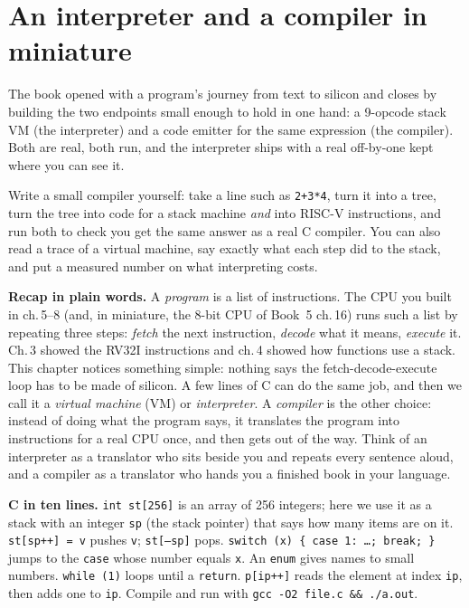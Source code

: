 \chapter{An interpreter and a compiler in miniature}
\label{ch:systems18}

The book opened with a program's journey from text to silicon and
closes by building the two endpoints small enough to hold in one
hand: a 9-opcode stack VM (the interpreter) and a code emitter for
the same expression (the compiler). Both are real, both run, and
the interpreter ships with a real off-by-one kept where you can
see it.

\begin{wins}
Write a small compiler yourself: take a line such as
\texttt{2+3*4}, turn it into a tree, turn the tree into code for a
stack machine \emph{and} into RISC-V instructions, and run both to
check you get the same answer as a real C compiler. You can also read
a trace of a virtual machine, say exactly what each step did to the
stack, and put a measured number on what interpreting costs.
\end{wins}

\begin{rulebox}
\textbf{Recap in plain words.} A \emph{program} is a list of
instructions. The CPU you built in ch.\,5--8 (and, in miniature, the
8-bit CPU of Book~5 ch.\,16) runs such a list by repeating three
steps: \emph{fetch} the next instruction, \emph{decode} what it
means, \emph{execute} it. Ch.\,3 showed the RV32I instructions and ch.\,4
showed how functions use a stack. This chapter notices something
simple: nothing says the fetch-decode-execute loop has to be made of
silicon. A few lines of C can do the same job, and then we call it a
\emph{virtual machine} (VM) or \emph{interpreter}. A \emph{compiler}
is the other choice: instead of doing what the program says, it
translates the program into instructions for a real CPU once, and
then gets out of the way. Think of an interpreter as a translator who
sits beside you and repeats every sentence aloud, and a compiler as a
translator who hands you a finished book in your language.

\textbf{C in ten lines.} \texttt{int st[256]} is an array of 256 integers; here we use
it as a stack with an integer \texttt{sp} (the stack pointer) that
says how many items are on it. \texttt{st[sp++] = v} pushes
\texttt{v}; \texttt{st[--sp]} pops. \texttt{switch (x) \{ case 1: \dots; break; \}}
jumps to the \texttt{case} whose number equals \texttt{x}.
An \texttt{enum} gives names to small numbers. \texttt{while (1)} loops until a
\texttt{return}. \texttt{p[ip++]} reads the element at index
\texttt{ip}, then adds one to \texttt{ip}. Compile and run with
\texttt{gcc -O2 file.c \&\& ./a.out}.
\end{rulebox}

